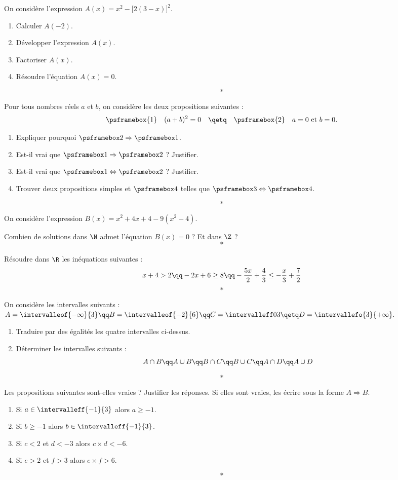 \documentclass[10pt,openright,twoside,french]{book}
\begin{document}
\exo
On considère l'expression $A(x) = x^2 - \big[2(3-x)\big]^2$.
\begin{enumerate}
    \item Calculer $A(-2)$.
    \item Développer l'expression $A(x)$.
    \item Factoriser $A(x)$.
    \item Résoudre l'équation $A(x) = 0$.
\end{enumerate}\[*\]

\exo
Pour tous nombres réels $a$ et $b$, on considère les deux propositions suivantes :
\[\psframebox{1} \quad (a + b)^2 = 0 \quad\qetq\quad \psframebox{2}\quad a = 0 \text{ et } b = 0.\]

\begin{enumerate}
    \item Expliquer pourquoi $\psframebox 2 \Rightarrow \psframebox 1$.
    \item Est-il vrai que $\psframebox 1 \Rightarrow \psframebox 2$ ? Justifier.
    \item Est-il vrai que $\psframebox 1 \Leftrightarrow \psframebox 2$ ? Justifier.
    \item Trouver deux propositions simples  et $\psframebox 4$ telles que $\psframebox 3 \Leftrightarrow \psframebox 4$.
\end{enumerate}\[*\]\clearpage

\exo
On considère l'expression $B(x) = x^2 + 4x + 4 - 9(x^2 - 4)$.\par
Combien de solutions dans $\N$ admet l'équation $B(x) = 0$ ? Et dans $\Z$ ?\[*\]

\exo
Résoudre dans $\R$ les inéquations suivantes :
\[x+ 4 > 2 \qq -2x + 6 \geq 8 \qq -\frac{5x}{2} + \frac4 3 \leq -\frac x 3 + \frac 7 2\]\[*\]

\exo
On considère les intervalles suivants :
$A = \intervalleof{-\infty}{3} \qq B = \intervalleof{-2}{6} \qq C = \intervalleff 0 3 \qetq D = \intervallefo{3}{+\infty}.$
\begin{enumerate}
    \item Traduire par des égalités les quatre intervalles ci-dessus.
    \item Déterminer les intervalles suivants :
    \[A \cap B \qq A \cup B \qq B \cap C \qq B \cup C \qq A \cap D \qq A \cup D\]
\end{enumerate}\[*\]

\exo
Les propositions suivantes sont-elles vraies ? Justifier les réponses. Si elles sont vraies, les écrire sous la forme $A \Rightarrow B$.
\begin{enumerate}
    \item Si $a \in \intervalleff{-1}{3}$ alors $a \geq -1$.
    \item Si $b \geq -1$ alors $b \in \intervalleff{-1}{3}$.
    \item Si $c < 2$ et $d < -3$ alors $c \times d < -6$.
    \item Si $e > 2$ et $f > 3$ alors $e \times f > 6$.
\end{enumerate}\[*\]
\end{document}
